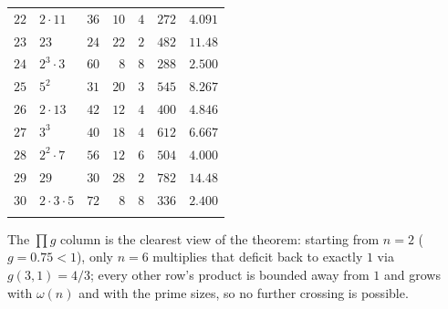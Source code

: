 \documentclass[11pt,a4paper]{article}
\theoremstyle{plain}
\theoremstyle{definition}
\begin{document}
\begin{longtable}{r l r r r r r}
$22$ & $2\cdot11$     & $36$ & $10$ & $4$ & $272$ & $4.091$\\
$23$ & $23$           & $24$ & $22$ & $2$ & $482$ & $11.48$\\
$24$ & $2^3\cdot3$    & $60$ & $8$  & $8$ & $288$ & $2.500$\\
$25$ & $5^2$          & $31$ & $20$ & $3$ & $545$ & $8.267$\\
$26$ & $2\cdot13$     & $42$ & $12$ & $4$ & $400$ & $4.846$\\
$27$ & $3^3$          & $40$ & $18$ & $4$ & $612$ & $6.667$\\
$28$ & $2^2\cdot7$    & $56$ & $12$ & $6$ & $504$ & $4.000$\\
$29$ & $29$           & $30$ & $28$ & $2$ & $782$ & $14.48$\\
$30$ & $2\cdot3\cdot5$& $72$ & $8$  & $8$ & $336$ & $2.400$\\
\bottomrule
\label{tab:full}
\end{longtable}

\noindent The $\prod g$ column is the clearest view of the theorem: starting
from $n=2$ ($g=0.75<1$), only $n=6$ multiplies that deficit back to exactly $1$
via $g(3,1)=4/3$; every other row's product is bounded away from $1$ and grows
with $\omega(n)$ and with the prime sizes, so no further crossing is possible.



\end{document}
